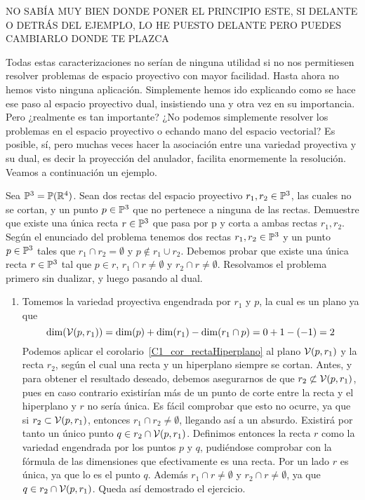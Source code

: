 NO SABÍA MUY BIEN DONDE PONER EL PRINCIPIO ESTE, SI DELANTE O DETRÁS DEL EJEMPLO, LO HE PUESTO DELANTE PERO PUEDES CAMBIARLO DONDE TE PLAZCA

Todas estas caracterizaciones no serían de ninguna utilidad si no nos permitiesen resolver problemas de espacio proyectivo con mayor facilidad. Hasta ahora no hemos visto ninguna aplicación. Simplemente hemos ido explicando como se hace ese paso al espacio proyectivo dual, insistiendo una y otra vez en su importancia. Pero ¿realmente es tan importante? ¿No podemos simplemente resolver los problemas en el espacio proyectivo o echando mano del espacio vectorial? Es posible, sí, pero muchas veces hacer la asociación entre una variedad proyectiva y su dual, es decir la proyección del anulador, facilita enormemente la resolución. Veamos a continuación un ejemplo.
\begin{exa}
	Sea $\mathbb{P}^3=\mathbb{P}(\mathbb{R}^4)$. Sean dos rectas del espacio proyectivo $r_1,r_2\in\mathbb{P}^3$, las cuales no se cortan, y un punto $p\in\mathbb{P}^3$ que no pertenece a ninguna de las rectas. Demuestre que existe una única recta $r\in\mathbb{P}^3$ que pasa por p y corta a ambas rectas $r_1, r_2$.\\
	
	Según el enunciado del problema tenemos dos rectas $r_1,r_2\in\mathbb{P}^3$ y un punto $p\in\mathbb{P}^3$ tales que $r_1\cap r_2=\emptyset$ y $p\not\in r_1\cup r_2$. Debemos probar que existe una única recta $r\in\mathbb{P}^3$ tal que $p\in r$, $r_1\cap r\not=\emptyset$ y $r_2\cap r\not=\emptyset$. Resolvamos el problema primero sin dualizar, y luego pasando al dual.
	\begin{enumerate}
		\item Tomemos la variedad proyectiva engendrada por $r_1$ y $p$, la cual es un plano ya que
		\begin{equation*}
		\dim(\mathcal{V}(p,r_1))=\dim(p)+\dim(r_1)-\dim(r_1\cap p)=0+1-(-1)=2
		\end{equation*}
		Podemos aplicar el corolario~\ref{C1_cor_rectaHiperplano} al plano $\mathcal{V}(p,r_1)$ y la recta $r_2$, según el cual una recta y un hiperplano siempre se cortan. Antes, y para obtener el resultado deseado, debemos asegurarnos de que $r_2\not\subset\mathcal{V}(p,r_1)$, pues en caso contrario existirían más de un punto de corte entre la recta y el hiperplano y $r$ no sería única. Es fácil comprobar que esto no ocurre, ya que si $r_2\subset\mathcal{V}(p,r_1)$, entonces $r_1\cap r_2\not=\emptyset$, llegando así a un absurdo. Existirá por tanto un único punto $q\in r_2\cap\mathcal{V}(p,r_1)$. Definimos entonces la recta $r$ como la variedad engendrada por los puntos $p$ y $q$, pudiéndose comprobar con la fórmula de las dimensiones que efectivamente es una recta. Por un lado $r$ es única, ya que lo es el punto $q$. Además $r_1\cap r\not=\emptyset$ y $r_2\cap r\not=\emptyset$, ya que $q\in r_2\cap\mathcal{V}(p,r_1)$. Queda así demostrado el ejercicio.
		

\end{enumerate}
\end{exa}
